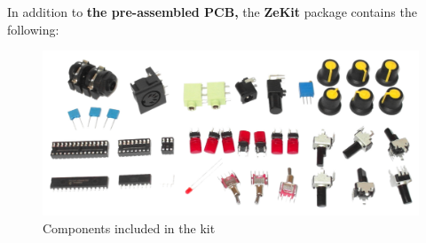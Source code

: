 \documentclass{scrartcl}
\begin{document}
In addition to \textbf{the pre-assembled PCB,} the \textbf{ZeKit} package contains the following:
\vspace{-0.25cm}

\begin{figure}[!ht]
    \begin{center}
        \includegraphics[scale=0.32]{assets/zekit-content.jpg}
        \caption{Components included in the kit}
    \end{center}
\end{figure}

\vspace{0.25cm}
\end{document}
